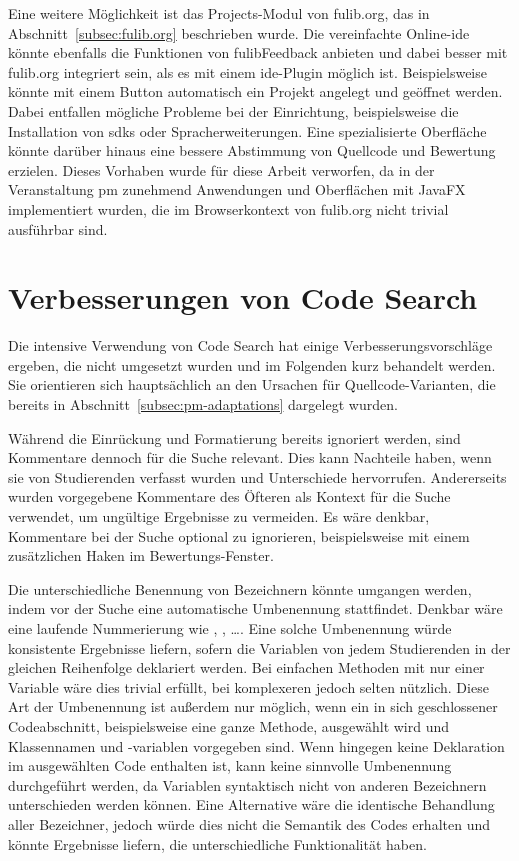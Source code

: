 Eine weitere Möglichkeit ist das Projects-Modul von fulib.org, das in Abschnitt~\ref{subsec:fulib.org} beschrieben wurde.
Die vereinfachte Online-\ac{ide} könnte ebenfalls die Funktionen von fulibFeedback anbieten und dabei besser mit fulib.org integriert sein, als es mit einem \ac{ide}-Plugin möglich ist.
Beispielsweise könnte mit einem Button automatisch ein Projekt angelegt und geöffnet werden.
Dabei entfallen mögliche Probleme bei der Einrichtung, beispielsweise die Installation von \acp{sdk} oder Spracherweiterungen.
Eine spezialisierte Oberfläche könnte darüber hinaus eine bessere Abstimmung von Quellcode und Bewertung erzielen.
Dieses Vorhaben wurde für diese Arbeit verworfen, da in der Veranstaltung \ac{pm} zunehmend Anwendungen und Oberflächen mit JavaFX implementiert wurden, die im Browserkontext von fulib.org nicht trivial ausführbar sind.

\section{Verbesserungen von Code Search}\label{sec:code-search-improvements}

Die intensive Verwendung von Code Search hat einige Verbesserungsvorschläge ergeben, die nicht umgesetzt wurden und im Folgenden kurz behandelt werden.
Sie orientieren sich hauptsächlich an den Ursachen für Quellcode-Varianten, die bereits in Abschnitt~\ref{subsec:pm-adaptations} dargelegt wurden.

Während die Einrückung und Formatierung bereits ignoriert werden, sind Kommentare dennoch für die Suche relevant.
Dies kann Nachteile haben, wenn sie von Studierenden verfasst wurden und Unterschiede hervorrufen.
Andererseits wurden vorgegebene Kommentare des Öfteren als Kontext für die Suche verwendet, um ungültige Ergebnisse zu vermeiden.
Es wäre denkbar, Kommentare bei der Suche optional zu ignorieren, beispielsweise mit einem zusätzlichen Haken im Bewertungs-Fenster.

Die unterschiedliche Benennung von Bezeichnern könnte umgangen werden, indem vor der Suche eine automatische Umbenennung stattfindet.
Denkbar wäre eine laufende Nummerierung wie , , \ldots.
Eine solche Umbenennung würde konsistente Ergebnisse liefern, sofern die Variablen von jedem Studierenden in der gleichen Reihenfolge deklariert werden.
Bei einfachen Methoden mit nur einer Variable wäre dies trivial erfüllt, bei komplexeren jedoch selten nützlich.
Diese Art der Umbenennung ist außerdem nur möglich, wenn ein in sich geschlossener Codeabschnitt, beispielsweise eine ganze Methode, ausgewählt wird und Klassennamen und -variablen vorgegeben sind.
Wenn hingegen keine Deklaration im ausgewählten Code enthalten ist, kann keine sinnvolle Umbenennung durchgeführt werden, da Variablen syntaktisch nicht von anderen Bezeichnern unterschieden werden können.
Eine Alternative wäre die identische Behandlung aller Bezeichner, jedoch würde dies nicht die Semantik des Codes erhalten und könnte Ergebnisse liefern, die unterschiedliche Funktionalität haben.

